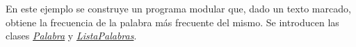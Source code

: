 En este ejemplo se construye un programa modular que, dado un texto marcado, obtiene la frecuencia de la palabra más frecuente del mismo. Se introducen las clases {\itshape  \hyperlink{class_palabra}{Palabra}} y {\itshape  \hyperlink{class_lista_palabras}{Lista\-Palabras}}. 
